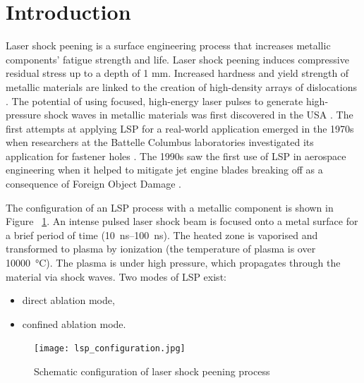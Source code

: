 \documentclass[sn-nature]{sn-jnl}%
\theoremstyle{thmstyleone}%
\theoremstyle{thmstyletwo}%
\theoremstyle{thmstylethree}%
\begin{document}


\section{Introduction}\label{sec1}


Laser shock peening is a surface engineering process that increases metallic components' fatigue strength and life. Laser shock peening induces compressive residual stress up to a depth of 1 mm. Increased hardness and yield strength of metallic materials are linked to the creation of high-density arrays of dislocations \cite{Banas19900301}. The potential of using focused, high-energy laser pulses to generate high-pressure shock waves in metallic materials was first discovered in the USA \cite{White19630701}. The first attempts at applying LSP for a real-world application emerged in the 1970s when researchers at the Battelle Columbus laboratories investigated its application for fastener holes \cite{Clauer2019}. The 1990s saw the first use of LSP in aerospace engineering when it helped to mitigate jet engine blades breaking off as a consequence of Foreign Object Damage \cite{Clauer20160906}.


The configuration of an LSP process with a metallic component is shown in Figure~ \ref{fig:lspconfiguration}. An intense pulsed laser shock beam is focused onto a metal surface for a brief period of time (\SIrange{10}{100}{\ns}). The heated zone is vaporised and transformed to plasma by ionization (the temperature of plasma is over \SI{10000}{\degreeCelsius}). The plasma is under high pressure, which propagates through the material via shock waves. Two modes of LSP exist: 

\begin{itemize}

    \item direct ablation mode,
    \item confined ablation mode.

\end{itemize}

    \begin{figure}[h!]     
    \centering
    \texttt{[image: lsp\_configuration.jpg]}
    \caption{Schematic configuration of laser shock peening process \cite{Fabbro19981201}}
    \label{fig:lspconfiguration}
    \end{figure}
\end{document}
